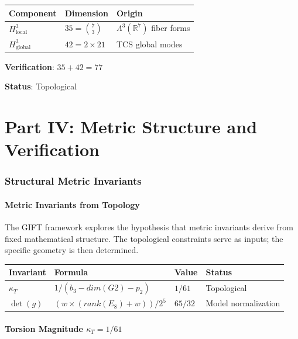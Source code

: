 \documentclass[11pt,a4paper]{article}
\newcommand{\E}{\mathrm{E}}
\newcommand{\Gtwo}{\mathrm{G}_2}
\newcommand{\dimE}{\mathrm{dim}}
\newcommand{\rk}{\mathrm{rank}}
\newcommand{\topomark}{\textsc{Topological}}
\def\Gtwo{G2}%
\def\E{E}%
\def\dimE{dim}%
\def\rk{rank}%
\def\topomark{Topological}%
\begin{document}
\begin{table}[H]
\centering
\begin{tabular}{lll}
\toprule
Component & Dimension & Origin \\
\midrule
$H^3_{\text{local}}$ & $35 = \binom{7}{3}$ & $\Lambda^3(\mathbb{R}^7)$ fiber forms \\
$H^3_{\text{global}}$ & $42 = 2 \times 21$ & TCS global modes \\
\bottomrule
\end{tabular}
\end{table}

\textbf{Verification}: $35 + 42 = 77$

\textbf{Status}: \topomark{}

\newpage
\part*{Part IV: Metric Structure and Verification}

\section{Structural Metric Invariants}

\subsection{Metric Invariants from Topology}

The GIFT framework explores the hypothesis that metric invariants derive from fixed mathematical structure. The topological constraints serve as inputs; the specific geometry is then determined.

\begin{table}[H]
\centering
\begin{tabular}{llll}
\toprule
Invariant & Formula & Value & Status \\
\midrule
$\kappa_T$ & $1/(b_3 - \dimE(\Gtwo) - p_2)$ & $1/61$ & \topomark{} \\
$\det(g)$ & $(w \times (\rk(\E_8) + w))/2^5$ & $65/32$ & Model normalization \\
\bottomrule
\end{tabular}
\end{table}

\subsection{Torsion Magnitude $\kappa_T = 1/61$}
\end{document}
